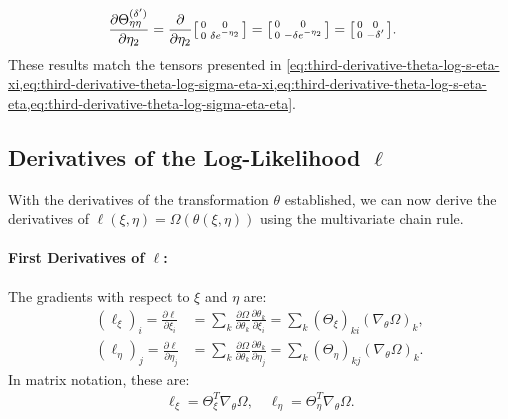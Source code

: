 \documentclass{article}
\begin{document}
\begin{align}
  \frac{\partial \Theta_{\eta\eta}^{(\delta')}}{\partial \eta_2} & = \frac{\partial}{\partial \eta_2} \begin{bsmallmatrix} 0 & 0 \\ 0 & \delta e^{-\eta_2} \end{bsmallmatrix} = \begin{bsmallmatrix} 0 & 0 \\ 0 & -\delta e^{-\eta_2} \end{bsmallmatrix} = \begin{bsmallmatrix} 0 & 0 \\ 0 & -\delta' \end{bsmallmatrix}.
\end{align}
%
These results match the tensors presented in \cref{eq:third-derivative-theta-log-s-eta-xi,eq:third-derivative-theta-log-sigma-eta-xi,eq:third-derivative-theta-log-s-eta-eta,eq:third-derivative-theta-log-sigma-eta-eta}.

\subsection{Derivatives of the Log-Likelihood $\ell$}

With the derivatives of the transformation $\theta$ established, we can now derive the derivatives of $\ell(\xi, \eta) = \Omega(\theta(\xi, \eta))$ using the multivariate chain rule.

\paragraph{First Derivatives of $\ell$:}

The gradients with respect to $\xi$ and $\eta$ are:
%
\begin{align}
  (\ell_\xi)_i = \frac{\partial \ell}{\partial \xi_i}   & = \sum_k \frac{\partial \Omega}{\partial \theta_k} \frac{\partial \theta_k}{\partial \xi_i} = \sum_k (\Theta_\xi)_{ki} (\nabla_\theta \Omega)_k,   \\
  (\ell_\eta)_j = \frac{\partial \ell}{\partial \eta_j} & = \sum_k \frac{\partial \Omega}{\partial \theta_k} \frac{\partial \theta_k}{\partial \eta_j} = \sum_k (\Theta_\eta)_{kj} (\nabla_\theta \Omega)_k.
\end{align}
%
In matrix notation, these are:
%
\begin{align}
  \ell_\xi = \Theta_{\xi}^{T} \nabla_\theta \Omega, \quad \ell_\eta = \Theta_{\eta}^{T} \nabla_\theta \Omega.
\end{align}
\end{document}
